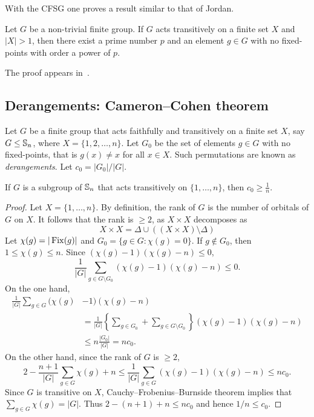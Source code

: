 With the CFSG one proves a result similar to that of Jordan. 

\begin{theorem}
    Let $G$ be a non-trivial finite group. If $G$ acts transitively
    on a finite set $X$ and $|X|>1$, then
    there exist a prime number $p$ and an element $g\in G$ with no fixed-points
    with order a power of $p$.
\end{theorem}

The proof appears in~\cite{MR636194}. 

\subsection{Derangements: Cameron--Cohen theorem}

Let $G$ be a finite group that acts faithfully and transitively 
on a finite set $X$, say 
$G\leq\mathbb{S}_n$, where $X=\{1,2,\dots,n\}$. Let 
$G_0$ be the set of elements $g\in G$ with no fixed-points, 
that is $g(x)\ne x$ for all $x\in X$. 
Such permutations are known as \emph{derangements}. 
Let $c_0=|G_0|/|G|$. 

\begin{theorem}
    If $G$ is a subgroup of $\mathbb{S}_n$ that acts transitively on 
    $\{1,\dots,n\}$, then $c_0\geq\frac{1}{n}$.
\end{theorem}

\begin{proof}
    Let $X=\{1,\dots,n\}$. By definition, the rank of $G$ is the number
    of orbitals of $G$ on $X$. It follows that the rank is $\geq2$, as
    $X\times X$ decomposes as 
    \[
    X\times X=\Delta\cup\left((X\times X)\setminus\Delta\right)
    \]
    Let $\chi(g)=|\operatorname{Fix}(g)|$ and $G_0=\{g\in G:\chi(g)=0\}$. If $g\not\in G_0$, then $1\leq\chi(g)\leq n$. Since  
    $(\chi(g)-1)(\chi(g)-n)\leq 0$,
    \[
    \frac{1}{|G|}\sum_{g\in G\setminus G_0}(\chi(g)-1)(\chi(g)-n)\leq 0.
    \]
    On the one hand, 
    \begin{align*}
    \frac{1}{|G|}\sum_{g\in G}(\chi(g)&-1)(\chi(g)-n)\\
    &=\frac{1}{|G|}\left\{\sum_{g\in G_0}+\sum_{g\in G\setminus G_0}\right\}(\chi(g)-1)(\chi(g)-n)\\
    &\leq n\frac{|G_0|}{|G|}=nc_0.
    \end{align*}
    On the other hand, since the rank of $G$ is $\geq2$, 
    \begin{equation}
        \label{eq:CameronCohen}
        2-\frac{n+1}{|G|}\sum_{g\in G}\chi(g)+n\leq 
        \frac{1}{|G|}\sum_{g\in G}(\chi(g)-1)(\chi(g)-n)\leq nc_0.
    \end{equation}
    Since $G$ is transitive on $X$, Cauchy--Frobenius--Burnside theorem implies that
    $\sum_{g\in G}\chi(g)=|G|$. Thus $2-(n+1)+n\leq nc_0$ and hence
    $1/n\leq c_0$. 
\end{proof}

